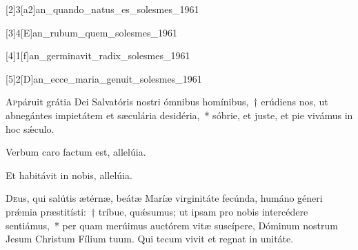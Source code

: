 \documentclass[vesperale_romanum.tex]{subfiles}
\begin{document}


[2]{3}[a2]{an_quando_natus_es_solesmes_1961}



[3]{4}[E]{an_rubum_quem_solesmes_1961}


[4]{1}[f]{an_germinavit_radix_solesmes_1961}


[5]{2}[D]{an_ecce_maria_genuit_solesmes_1961}





\lettrine{A}{p}páruit grátia Dei Salvatóris nostri ómnibus homínibus,~† erúdiens nos, ut abnegántes impietátem et sæculária desidéria,~* sóbrie, et juste, et pie vivámus in hoc sǽculo.


\vv Verbum caro factum est, allelúia.

\rr Et habitávit in nobis, allelúia.


 \label{or_jan_1}
 
\oratio

\lettrine{D}{e}us, qui salútis ætérnæ, beátæ Maríæ virginitáte fecúnda, humáno géneri prǽmia præstitísti:~† tríbue, quǽsumus; ut i\-psam pro nobis intercédere sentiámus,~* per quam merúimus auctórem vitæ suscípere, Dóminum nostrum Jesum Christum Fílium tuum.
Qui tecum vivit et regnat in unitáte.


\end{document}
